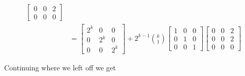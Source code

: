 \documentclass{article}
\begin{document}
\begin{align*}
\begin{bmatrix}
    0 & 0 & 2 \\
    0 & 0 & 0
   \end{bmatrix} \\
   &=\begin{bmatrix}
    2^{k} & 0 & 0 \\
    0 & 2^{k} & 0 \\
    0 & 0 & 2^{k}
\end{bmatrix} + 2^{k-1}\binom{k}{1}\begin{bmatrix}
    1 & 0 & 0 \\
    0 & 1 & 0 \\
    0 & 0 & 1
\end{bmatrix}\begin{bmatrix}
    0 & 0 & 2 \\
    0 & 0 & 2 \\
    0 & 0 & 0
   \end{bmatrix} 
\end{align*}

\pagebreak

\noindent Continuing where we left off we get
\end{document}
